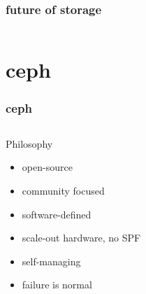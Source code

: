 \documentclass[10pt, compress]{beamer}
\begin{document}

\begin{frame}[fragile]
  \frametitle{future of storage}
    \begin{columns}
        
        
    \end{columns}
\end{frame}


\section{ceph}
\begin{frame}[fragile]
  \frametitle{ceph}
    \begin{columns}
            \begin{block}{Philosophy}
                \begin{itemize}[<+->]
                \item open-source
                \item community focused
                \item software-defined
                \item scale-out hardware, no SPF
                \item self-managing
                \item failure is normal
                \end{itemize}
                \vspace*{5mm}
            \end{block}
    \end{columns}
\end{frame}
\end{document}
